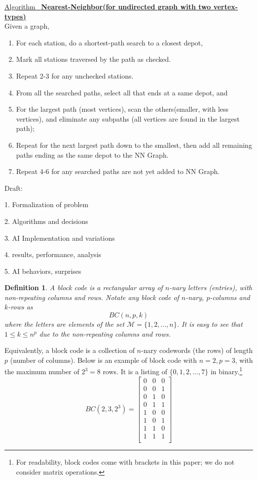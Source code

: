 \documentclass[12pt]{article}  %
\newtheorem{definition}{Definition}
\newcommand{\algtitle}[1]{\underline{Algorithm \ {\bf #1}} \vspace*{1mm}\\}
\begin{document}
\algtitle{Nearest-Neighbor(for undirected graph with two vertex-types)}
Given a graph,
\begin{enumerate}
	\item For each station, do a shortest-path search to a closest depot,
	\item Mark all stations traversed by the path as checked.
	\item Repeat 2-3 for any unchecked stations.
	\item From all the searched paths, select all that ends at a same depot, and 
	\item For the largest path (most vertices), scan the others(smaller, with less vertices), and eliminate any subpaths (all vertices are found in the largest path);
	\item Repeat for the next largest path down to the smallest, then add all remaining paths ending as the same depot to the NN Graph.
	\item Repeat 4-6 for any searched paths are not yet added to NN Graph.
\end{enumerate}




Draft:

1. Formalization of problem

2. Algorithms and decisions

3. AI Implementation and variations

4. results, performance, analysis

5. AI behaviors, surprises



\begin{definition}
A block code is a rectangular array of $n$-nary letters (entries), with non-repeating columns and rows. Notate any block code of $n$-nary, $p$-columns and $k$-rows as 
$$BC(n,p,k)$$
where the letters are elements of the set $\mathcal{M}=\{1,2,\dots,n\}$. 
It is easy to see that $1\leq k \leq n^p$ due to the non-repeating columns and rows.
\end{definition}

Equivalently, a block code is a collection of $n$-nary codewords (the rows) of length $p$ (number of columns). Below is an example of block code with $n=2,p=3$, with the maximum number of $2^3=8$ rows. It is a listing of $\{0,1,2,\dots,7\}$ in binary.\footnote{For readability, block codes come with brackets in this paper; we do not consider matrix operations.}
$$BC(2,3,2^3)=
\left[\begin{array}{ccc}
0 & 0 & 0 \\
0 & 0 & 1 \\
0 & 1 & 0 \\
0 & 1 & 1 \\
1 & 0 & 0 \\
1 & 0 & 1 \\
1 & 1 & 0 \\
1 & 1 & 1 \\
\end{array}\right]
$$
\end{document}
